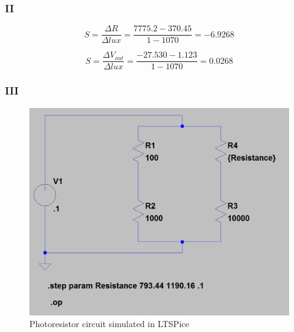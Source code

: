 \documentclass[10pt]{article}
\begin{document}
\subsubsection*{II}
\[S = \frac{\Delta R}{\Delta lux} = \frac{7775.2-370.45}{1-1070} = -6.9268\]

\[S = \frac{\Delta V_{out}}{\Delta lux} = \frac{-27.530-1.123}{1-1070} = 0.0268\]

\subsubsection*{III}
\begin{figure}[H]
	\centering
	\includegraphics[width=\textwidth]{3}
	\caption{Photoresistor circuit simulated in LTSPice}
\end{figure}
\end{document}
